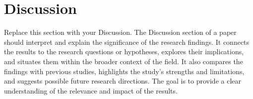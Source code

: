 \section{Discussion}
\label{Discussion}

Replace this section with your Discussion.  The Discussion section of a paper should interpret and explain the significance of the research findings. It connects the results to the research questions or hypotheses, explores their implications, and situates them within the broader context of the field. It also compares the findings with previous studies, highlights the study’s strengths and limitations, and suggests possible future research directions. The goal is to provide a clear understanding of the relevance and impact of the results.